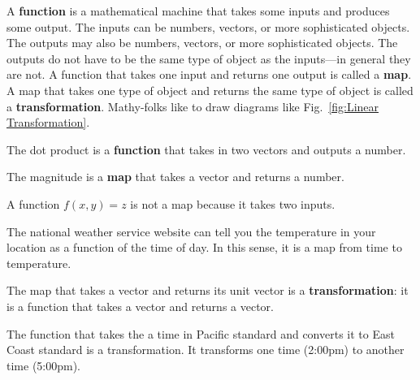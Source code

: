 \documentclass[12pt]{article}
\begin{document}
A \textbf{function} is a mathematical machine that takes some inputs and produces some output. The inputs can be numbers, vectors, or more sophisticated objects. The outputs may also be numbers, vectors, or more sophisticated objects. The outputs do not have to be the same type of object as the inputs---in general they are not.
% 
A function that takes one input and returns one output is called a \textbf{map}. 
% 
A map that takes one type of object and returns the same type of object is called a \textbf{transformation}. Mathy-folks like to draw diagrams like Fig.~\ref{fig:Linear Transformation}.

\begin{example}
The dot product is a \textbf{function} that takes in two vectors and outputs a number.
\end{example}
\begin{example}
The magnitude is a \textbf{map} that takes a vector and returns a number.
\end{example}
\begin{example}
A function $f(x,y)=z$ is not a map because it takes two inputs.
\end{example}
\begin{example}
The national weather service website can tell you the temperature in your location as a function of the time of day. In this sense, it is a map from time to temperature.
\end{example}
\begin{example}
The map that takes a vector and returns its unit vector is a \textbf{transformation}: it is a function that takes a vector and returns a vector.
\end{example}
\begin{example}
The function that takes the a time in Pacific standard and converts it to East Coast standard is a transformation. It transforms one time (2:00pm) to another time (5:00pm).
\end{example}
\end{document}
